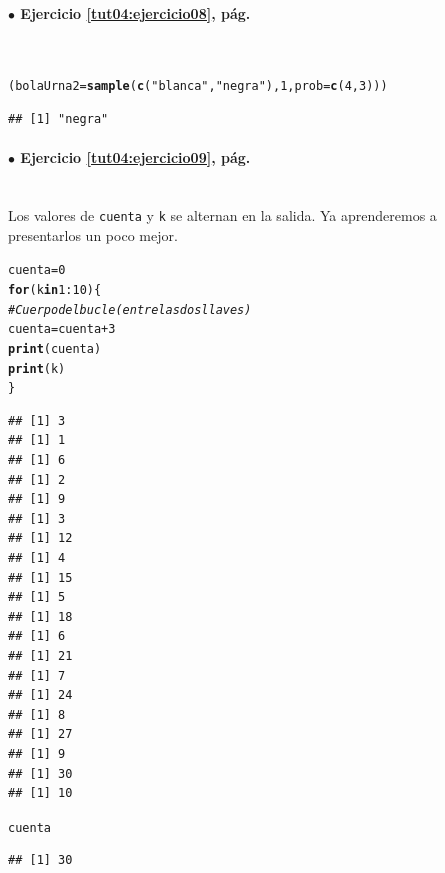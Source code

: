 \documentclass[10pt,a4paper]{article}\usepackage[]{graphicx}\usepackage[]{color}
\makeatletter
\newcommand{\hlnum}[1]{\textcolor[rgb]{0.686,0.059,0.569}{#1}}%
\newcommand{\hlstr}[1]{\textcolor[rgb]{0.192,0.494,0.8}{#1}}%
\newcommand{\hlcom}[1]{\textcolor[rgb]{0.678,0.584,0.686}{\textit{#1}}}%
\newcommand{\hlopt}[1]{\textcolor[rgb]{0,0,0}{#1}}%
\newcommand{\hlstd}[1]{\textcolor[rgb]{0.345,0.345,0.345}{#1}}%
\newcommand{\hlkwa}[1]{\textcolor[rgb]{0.161,0.373,0.58}{\textbf{#1}}}%
\newcommand{\hlkwb}[1]{\textcolor[rgb]{0.69,0.353,0.396}{#1}}%
\newcommand{\hlkwc}[1]{\textcolor[rgb]{0.333,0.667,0.333}{#1}}%
\newcommand{\hlkwd}[1]{\textcolor[rgb]{0.737,0.353,0.396}{\textbf{#1}}}%
\newenvironment{kframe}{%
 \def\at@end@of@kframe{}%
 \ifinner\ifhmode%
  \def\at@end@of@kframe{\end{minipage}}%
  \begin{minipage}{\columnwidth}%
 \fi\fi%
 \def\FrameCommand##1{\hskip\@totalleftmargin \hskip-\fboxsep
 \colorbox{shadecolor}{##1}\hskip-\fboxsep
     \hskip-\linewidth \hskip-\@totalleftmargin \hskip\columnwidth}%
 \MakeFramed {\advance\hsize-\width
   \@totalleftmargin\z@ \linewidth\hsize
   \@setminipage}}%
 {\par\unskip\endMakeFramed%
 \at@end@of@kframe}
\newenvironment{knitrout}{}{} %
\makeatother
\begin{document}
\paragraph{\bf $\bullet$ Ejercicio \ref{tut04:ejercicio08}, pág. \pageref{tut04:ejercicio08}}
\label{tut04:ejercicio08:sol}\quad\\

\begin{knitrout}
\color{fgcolor}\begin{kframe}
\begin{alltt}
\hlstd{(bolaUrna2} \hlkwb{=} \hlkwd{sample}\hlstd{(} \hlkwd{c}\hlstd{(}\hlstr{"blanca"}\hlstd{,}\hlstr{"negra"}\hlstd{),} \hlnum{1}\hlstd{,} \hlkwc{prob}\hlstd{=}\hlkwd{c}\hlstd{(}\hlnum{4}\hlstd{,}\hlnum{3}\hlstd{) ))}
\end{alltt}
\begin{verbatim}
## [1] "negra"
\end{verbatim}
\end{kframe}
\end{knitrout}

\paragraph{\bf $\bullet$ Ejercicio \ref{tut04:ejercicio09}, pág. \pageref{tut04:ejercicio09}}
\label{tut04:ejercicio09:sol}\quad\\

Los valores de {\tt cuenta} y {\tt k} se alternan en la salida. Ya aprenderemos a presentarlos un poco mejor.
\begin{knitrout}
\color{fgcolor}\begin{kframe}
\begin{alltt}
    \hlstd{cuenta}\hlkwb{=}\hlnum{0}
    \hlkwa{for}\hlstd{(k} \hlkwa{in} \hlnum{1}\hlopt{:}\hlnum{10}\hlstd{)\{}
        \hlcom{# Cuerpo del bucle (entre las dos llaves)}
        \hlstd{cuenta} \hlkwb{=} \hlstd{cuenta} \hlopt{+} \hlnum{3}
        \hlkwd{print}\hlstd{(cuenta)}
        \hlkwd{print}\hlstd{(k)}
    \hlstd{\}}
\end{alltt}
\begin{verbatim}
## [1] 3
## [1] 1
## [1] 6
## [1] 2
## [1] 9
## [1] 3
## [1] 12
## [1] 4
## [1] 15
## [1] 5
## [1] 18
## [1] 6
## [1] 21
## [1] 7
## [1] 24
## [1] 8
## [1] 27
## [1] 9
## [1] 30
## [1] 10
\end{verbatim}
\begin{alltt}
    \hlstd{cuenta}
\end{alltt}
\begin{verbatim}
## [1] 30
\end{verbatim}
\end{kframe}
\end{knitrout}
\end{document}
